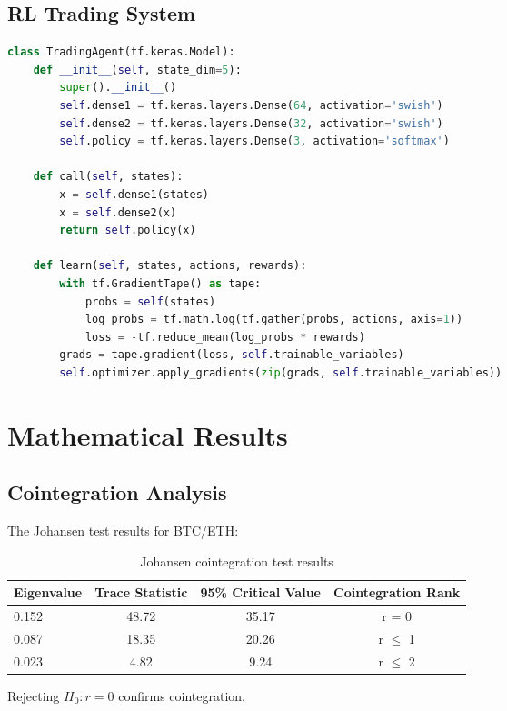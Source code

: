 \documentclass[article]{arithmaxresearch}
\begin{document}
\subsection{RL Trading System}
\begin{lstlisting}[language=Python, basicstyle=\small\ttfamily]
class TradingAgent(tf.keras.Model):
    def __init__(self, state_dim=5):
        super().__init__()
        self.dense1 = tf.keras.layers.Dense(64, activation='swish')
        self.dense2 = tf.keras.layers.Dense(32, activation='swish')
        self.policy = tf.keras.layers.Dense(3, activation='softmax')
        
    def call(self, states):
        x = self.dense1(states)
        x = self.dense2(x)
        return self.policy(x)
    
    def learn(self, states, actions, rewards):
        with tf.GradientTape() as tape:
            probs = self(states)
            log_probs = tf.math.log(tf.gather(probs, actions, axis=1))
            loss = -tf.reduce_mean(log_probs * rewards)
        grads = tape.gradient(loss, self.trainable_variables)
        self.optimizer.apply_gradients(zip(grads, self.trainable_variables))
\end{lstlisting}

\section{Mathematical Results}

\subsection{Cointegration Analysis}

The Johansen test results for BTC/ETH:

\begin{table}[h]
\centering
\begin{tabular}{lccc}
\toprule
Eigenvalue & Trace Statistic & 95\% Critical Value & Cointegration Rank \\
\midrule
0.152 & 48.72 & 35.17 & r = 0 \\
0.087 & 18.35 & 20.26 & r $\leq$ 1 \\
0.023 & 4.82 & 9.24 & r $\leq$ 2 \\
\bottomrule
\end{tabular}
\caption{Johansen cointegration test results}
\end{table}

Rejecting $H_0: r=0$ confirms cointegration.
\end{document}
